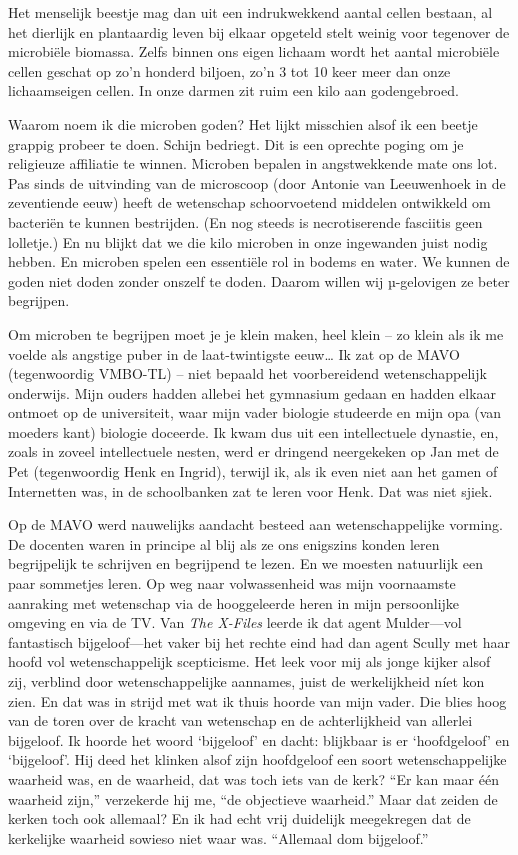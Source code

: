 \documentclass[12pt,a4paper]{article}
\begin{document}
Het menselijk beestje mag dan uit een indrukwekkend aantal cellen bestaan, al het dierlijk en plantaardig leven bij elkaar opgeteld stelt weinig voor tegenover de microbiële biomassa. Zelfs binnen ons eigen lichaam wordt het aantal microbiële cellen geschat op zo'n honderd biljoen, zo'n 3 tot 10 keer meer dan onze lichaamseigen cellen. In onze darmen zit ruim een kilo aan godengebroed.

Waarom noem ik die microben goden? Het lijkt misschien alsof ik een beetje grappig probeer te doen. Schijn bedriegt. Dit is een oprechte poging om je religieuze affiliatie te winnen. Microben bepalen in angstwekkende mate ons lot. Pas sinds de uitvinding van de microscoop (door Antonie van Leeuwenhoek in de zeventiende eeuw) heeft de wetenschap schoorvoetend middelen ontwikkeld om bacteriën te kunnen bestrijden. (En nog steeds is necrotiserende fasciitis geen lolletje.) En nu blijkt dat we die kilo microben in onze ingewanden juist nodig hebben. En microben spelen een essentiële rol in bodems en water. We kunnen de goden niet doden zonder onszelf te doden. Daarom willen wij µ-gelovigen ze beter begrijpen.

Om microben te begrijpen moet je je klein maken, heel klein – zo klein als ik me voelde als angstige puber in de laat-twintigste eeuw… Ik zat op de MAVO (tegenwoordig VMBO-TL) – niet bepaald het voorbereidend wetenschappelijk onderwijs. Mijn ouders hadden allebei het gymnasium gedaan en hadden elkaar ontmoet op de universiteit, waar mijn vader biologie studeerde en mijn opa (van moeders kant) biologie doceerde. Ik kwam dus uit een intellectuele dynastie, en, zoals in zoveel intellectuele nesten, werd er dringend neergekeken op Jan met de Pet (tegenwoordig Henk en Ingrid), terwijl ik, als ik even niet aan het gamen of Internetten was, in de schoolbanken zat te leren voor Henk. Dat was niet sjiek.

Op de MAVO werd nauwelijks aandacht besteed aan wetenschappelijke vorming. De docenten waren in principe al blij als ze ons enigszins konden leren begrijpelijk te schrijven en begrijpend te lezen. En we moesten natuurlijk een paar sommetjes leren. Op weg naar volwassenheid was mijn voornaamste aanraking met wetenschap via de hooggeleerde heren in mijn persoonlijke omgeving en via de TV. Van \emph{The X-Files} leerde ik dat agent Mulder—vol fantastisch bijgeloof—het vaker bij het rechte eind had dan agent Scully met haar hoofd vol wetenschappelijk scepticisme. Het leek voor mij als jonge kijker alsof zij, verblind door wetenschappelijke aannames, juist de werkelijkheid níet kon zien. En dat was in strijd met wat ik thuis hoorde van mijn vader. Die blies hoog van de toren over de kracht van wetenschap en de achterlijkheid van allerlei bijgeloof. Ik hoorde het woord ‘bijgeloof’ en dacht: blijkbaar is er ‘hoofdgeloof’ en ‘bijgeloof’. Hij deed het klinken alsof zijn hoofdgeloof een soort wetenschappelijke waarheid was, en de waarheid, dat was toch iets van de kerk? “Er kan maar één waarheid zijn,” verzekerde hij me, “de objectieve waarheid.” Maar dat zeiden de kerken toch ook allemaal? En ik had echt vrij duidelijk meegekregen dat de kerkelijke waarheid sowieso niet waar was. “Allemaal dom bijgeloof.”
\end{document}
